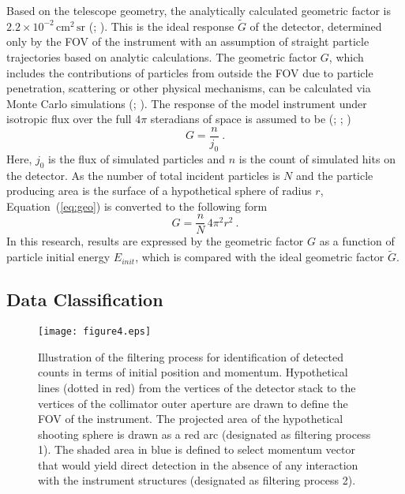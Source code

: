 \documentclass{jkas}
\begin{document}
Based on the telescope geometry, the analytically calculated geometric factor is $2.2\times10^{-2}\, \mathrm{cm}^2\,\mathrm{sr}$ (\citealt{sullivan1971}; \citealt{thomas1972}). This is the ideal response $\tilde{G}$ of the detector, determined only by the FOV of the instrument with an assumption of straight particle trajectories based on analytic calculations. The geometric factor $G$, which includes the contributions of particles from outside the FOV due to particle penetration, scattering or other physical mechanisms, can be calculated via Monte Carlo simulations (\citealt{wu1988}; \citealt{jun2002}). The response of the model instrument under isotropic flux over the full $4\pi$ steradians of space is assumed to be (\citealt{yando2011}; \citealt{zhao2013}; \citealt{park2014})
%
\begin{equation}
\label{eq:geo}
G = \frac{n}{j_0} ~ .
\end{equation}
%
Here, $j_0$ is the flux of simulated particles and $n$ is the count of simulated hits on the detector. As the number of total incident particles is $N$ and the particle producing area is the surface of a hypothetical sphere of radius $r$, Equation~(\ref{eq:geo}) is converted to the following form
%
\begin{equation}
\label{eq:trangeo}
G = \frac{n}{N}\,4\pi^2r^2 ~ .
\end{equation}
%
In this research, results are expressed by the geometric factor $G$ as a function of particle initial energy $E_{init}$, which is compared with the ideal geometric factor $\tilde{G}$.

\subsection{Data Classification\label{sec:datacla}}

\begin{figure}[t!]
\centering
\texttt{[image: figure4.eps]}
\caption{Illustration of the filtering process for identification of detected counts in terms of initial position and momentum. Hypothetical lines (dotted in red) from the vertices of the detector stack to the vertices of the collimator outer aperture are drawn to define the FOV of the instrument. The projected area of the hypothetical shooting sphere is drawn as a red arc (designated as filtering process 1). The shaded area in blue is defined to select momentum vector that would yield direct detection in the absence of any interaction with the instrument structures (designated as filtering process 2).\label{fig:fig4}}
\end{figure}
\end{document}
